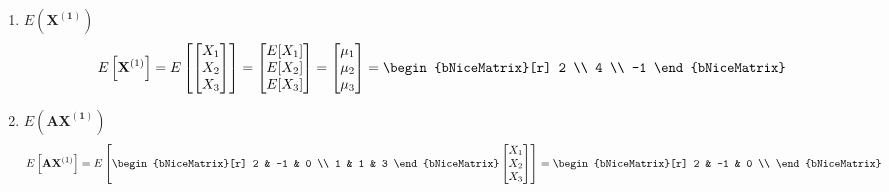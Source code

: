         \begin{enumerate}[label=(\alph*)]
            \item $E\left(\mathbf{X^{(1)}}\right)$
            \[
                E\left[\mathbf{X}^{(1)}\right]
                = 
                E\left[
                    \begin{bmatrix}
                        X_1 \\
                        X_2 \\
                        X_3
                    \end{bmatrix}
                \right]
                =
                \begin{bmatrix}
                    E[X_1] \\
                    E[X_2] \\
                    E[X_3]
                \end{bmatrix}
                =
                \begin{bmatrix}
                    \mu_1 \\
                    \mu_2 \\
                    \mu_3
                \end{bmatrix}
                =
                \begin{bNiceMatrix}[r]
                    2 \\
                    4 \\
                    -1
                \end{bNiceMatrix}
            \]
            \item $E\left(\mathbf{A}\mathbf{X^{(1)}}\right)$
            \[
                E\left[\mathbf{A}\mathbf{X}^{(1)}\right]
                =
                E\left[
                    \begin{bNiceMatrix}[r]
                        2 & -1 & 0 \\
                        1 & 1 & 3
                    \end{bNiceMatrix}
                    \begin{bmatrix}
                        X_1 \\
                        X_2 \\
                        X_3
                    \end{bmatrix}
                \right]
                =
                \begin{bNiceMatrix}[r]
                    2 & -1 & 0 \\

\end{bNiceMatrix}\]
\end{enumerate}
